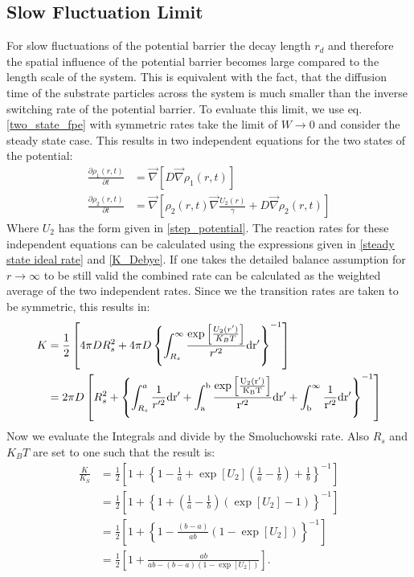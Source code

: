 
\subsection{Slow Fluctuation Limit}
For slow fluctuations of the potential barrier the decay length $r_d$ and therefore the spatial influence of the potential barrier becomes large compared to the length scale of the system. This is equivalent with the fact, that the diffusion time of the substrate particles across the system is much smaller than the inverse switching rate of the potential barrier. 
To evaluate this limit, we use eq. \eqref{two_state_fpe} with symmetric rates take the limit of $W \rightarrow 0$ and consider the steady state case.
This results in two independent equations for the two states of the potential:
\begin{align}
    \frac{\partial \rho_1(r,t)}{\partial t} &= \vec \nabla \left[ D \vec \nabla \rho_1(r,t) \right] \\ \nonumber
    \frac{\partial \rho_2(r,t)}{\partial t} &= \vec \nabla \left[\rho_2(r,t) \vec \nabla \frac{U_2(r)}{\gamma} + D \vec \nabla \rho_2(r,t) \right]
    \label{two_state_fpe_W_to_0}
\end{align}
Where $U_2$ has the form given in \eqref{step_potential}.
The reaction rates for these independent equations can be calculated using the expressions given in \eqref{steady state ideal rate} and \eqref{K_Debye}. If one takes the detailed balance assumption for $r \rightarrow \infty$ to be still valid the combined rate can be calculated as the weighted average of the two independent rates. Since we the transition rates are taken to be symmetric, this results in:
\begin{align}
    K &= \frac{1}{2} \left[ 4 \pi D R_s^2 + 4 \pi D  \left\{\int_{R_s}^{\infty} \frac{\exp \left[ \frac{U_2(r')}{K_B T}\right]}{r'^2} \rm d r' \right\}^{-1} \right] \\ \nonumber
    &= 2 \pi D \left[ R_s^2 +\left\{\int_{R_s}^{a} \frac{1}{r'^2} \rm d r' + \int_{a}^{b} \frac{\exp \left[ \frac{U_2(r')}{K_B T}\right]}{r'^2} \rm d r' + \int_{b}^{\infty} \frac{1}{r'^2} \rm d r' \right\}^{-1} \right]
\end{align}
Now we evaluate the Integrals and divide by the Smoluchowski rate. Also $R_s$ and $K_B T $ are set to one such that the result is:
\begin{align}
    \frac{K}{K_{S}} &= \frac{1}{2} \left[1 + \left\{ 1 -\frac{1}{a} + \exp[U_2] \left(\frac{1}{a} - \frac{1}{b}  \right) + \frac{1}{b} \right\}^{-1} \right] \nonumber \\
    &= \frac{1}{2}\left[ 1 + \left\{ 1 + \left( \frac{1}{a} - \frac{1}{b} \right)\left( \exp[U_2] -1 \right) \right\}^{-1} \right] \nonumber \\
    &= \frac{1}{2} \left[ 1 + \left\{ 1 - \frac{(b - a)}{ab}\left(1 - \exp[U_2] \right) \right\}^{-1} \right] \nonumber \\
    &= \frac{1}{2} \left[ 1 + \frac{ab}{ab - \left( b-a \right)\left(1 - \exp[U_2] \right)} \right].
    \label{two_state_K_slow}
\end{align}
